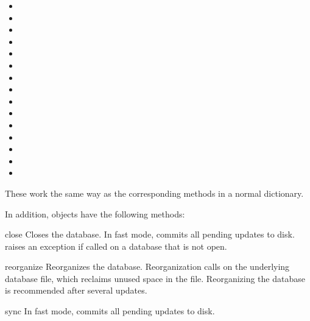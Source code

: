 \begin{itemize}
\item {}
\item {}
\item {}
\item {}
\item {}
\item {}
\item {}
\item {}
\item {}
\item {}
\item {}
\item {}
\item {}
\item {}
\item {}
\end{itemize}

These work the same way as the corresponding methods in a normal dictionary.

In addition,  objects have the following methods:

\begin{methoddesc}[e32dbm]{close}{}
Closes the database. In fast mode, commits all pending updates to disk. 
 raises an exception if called on a database that is not open.
\end{methoddesc}

\begin{methoddesc}[e32dbm]{reorganize}{}
Reorganizes the database. Reorganization calls  on the 
underlying  database file, which reclaims unused space in the 
file. Reorganizing the database is recommended after several updates.
\end{methoddesc}

\begin{methoddesc}[e32dbm]{sync}{}
In fast mode, commits all pending updates to disk.
\end{methoddesc}

